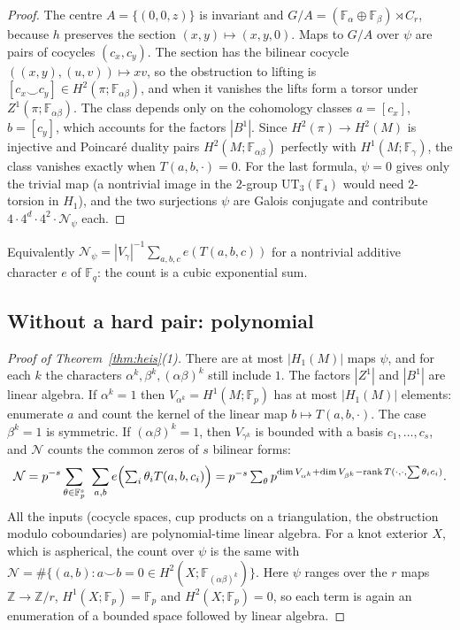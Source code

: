 \documentclass[11pt]{article}
\theoremstyle{definition}
\theoremstyle{remark}
\newcommand{\F}{\mathbb{F}}
\newcommand{\Z}{\mathbb{Z}}
\newcommand{\cN}{\mathcal{N}}
\begin{document}
\begin{proof}
The centre $A=\{(0,0,z)\}$ is invariant and $G/A=(\F_\alpha\oplus\F_\beta)
\rtimes C_r$, because $h$ preserves the section $(x,y)\mapsto(x,y,0)$. Maps to
$G/A$ over $\psi$ are pairs of cocycles $(c_x,c_y)$. The section has the
bilinear cocycle $((x,y),(u,v))\mapsto xv$, so the obstruction to lifting is
$[c_x\smile c_y]\in H^2(\pi;\F_{\alpha\beta})$, and when it vanishes the lifts
form a torsor under $Z^1(\pi;\F_{\alpha\beta})$. The class depends only on
the cohomology classes $a=[c_x]$, $b=[c_y]$, which accounts for the factors
$|B^1|$. Since $H^2(\pi)\to H^2(M)$ is injective and Poincar\'e duality pairs
$H^2(M;\F_{\alpha\beta})$ perfectly with $H^1(M;\F_\gamma)$, the class vanishes
exactly when $T(a,b,\cdot)=0$. For the last formula, $\psi=0$ gives only the
trivial map (a nontrivial image in the $2$-group $\mathrm{UT}_3(\F_4)$ would
need $2$-torsion in $H_1$), and the two surjections $\psi$ are Galois conjugate
and contribute $4\cdot4^d\cdot4^2\cdot\cN_\psi$ each.
\end{proof}

Equivalently $\cN_\psi=|V_\gamma|^{-1}\sum_{a,b,c}e(T(a,b,c))$ for a nontrivial
additive character $e$ of $\F_q$: the count is a cubic exponential sum.

\subsection{Without a hard pair: polynomial}

\begin{proof}[Proof of Theorem~\ref{thm:heis}(1)]
There are at most $|H_1(M)|$ maps $\psi$, and for each $k$ the characters
$\alpha^k,\beta^k,(\alpha\beta)^k$ still include $1$. The factors $|Z^1|$ and
$|B^1|$ are linear algebra. If $\alpha^k=1$ then $V_{\alpha^k}=H^1(M;\F_p)$ has
at most $|H_1(M)|$ elements: enumerate $a$ and count the kernel of the linear
map $b\mapsto T(a,b,\cdot)$. The case $\beta^k=1$ is symmetric. If
$(\alpha\beta)^k=1$, then $V_{\gamma^k}$ is bounded with a basis
$c_1,\dots,c_s$, and $\cN$ counts the common zeros of $s$ bilinear forms:
\[
\cN=p^{-s}\sum_{\theta\in\F_p^s}\ \sum_{a,b}e\Bigl(\textstyle\sum_i\theta_iT(a,b,c_i)\Bigr)
=p^{-s}\sum_{\theta}p^{\dim V_{\alpha^k}+\dim V_{\beta^k}-\operatorname{rank}T(\cdot,\cdot,\sum\theta_ic_i)}.
\]
All the inputs (cocycle spaces, cup products on a triangulation, the
obstruction modulo coboundaries) are polynomial-time linear algebra. For a
knot exterior $X$, which is aspherical, the count over $\psi$ is the same with
$\cN=\#\{(a,b):a\smile b=0\in H^2(X;\F_{(\alpha\beta)^k})\}$. Here $\psi$
ranges over the $r$ maps $\Z\to\Z/r$, $H^1(X;\F_p)=\F_p$ and $H^2(X;\F_p)=0$,
so each term is again an enumeration of a bounded space followed by linear
algebra.
\end{proof}
\end{document}
